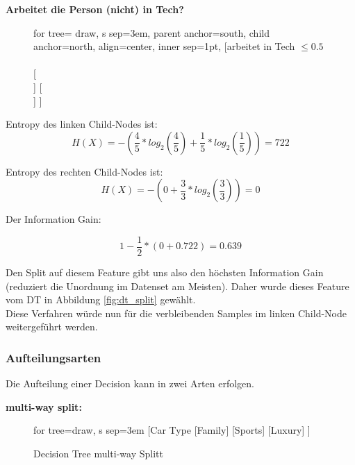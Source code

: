 \newpage
\textbf{Arbeitet die Person (nicht) in Tech?}
\begin{figure}[H]
	\centering
	\begin{forest}
	for tree={
		draw, 
		s sep=3em,
		parent anchor=south,
        child anchor=north,
        align=center,
        inner sep=1pt,
	}
	[arbeitet in Tech $\leq 0.5$ \\  \\ 
	    [ \\ ]
	    [ \\ ]
	]
	\end{forest}
\end{figure}

Entropy des linken Child-Nodes ist:
$$ H(X) = -\left(\frac{4}{5} * log_{2}\left(\frac{4}{5}\right) + \frac{1}{5} * log_{2}\left(\frac{1}{5}\right)\right) = 722 $$

Entropy des rechten Child-Nodes ist:
$$ H(X) = -\left(0 + \frac{3}{3} * log_{2}\left(\frac{3}{3}\right)\right) = 0 $$

Der Information Gain:

$$ 1 - \frac{1}{2}*(0 + 0.722) = 0.639 $$

Den Split auf diesem Feature gibt uns also den höchsten Information Gain (reduziert die Unordnung im Datenset am Meisten). Daher wurde dieses Feature vom DT in Abbildung \ref{fig:dt_split} gewählt. \\

Diese Verfahren würde nun für die verbleibenden Samples im linken Child-Node weitergeführt werden.

\newpage
\subsubsection{Aufteilungsarten}

Die Aufteilung einer Decision kann in zwei Arten erfolgen. 

\textbf{multi-way split:}\\
\begin{figure}[H]
	\centering
	\label{fig:dt_multi}
	\begin{forest}
	for tree={draw, s sep=3em}
	[Car Type
	    [Family]
	    [Sports]
	    [Luxury]
	]
	\end{forest}
	\caption{Decision Tree multi-way Splitt}
\end{figure}


